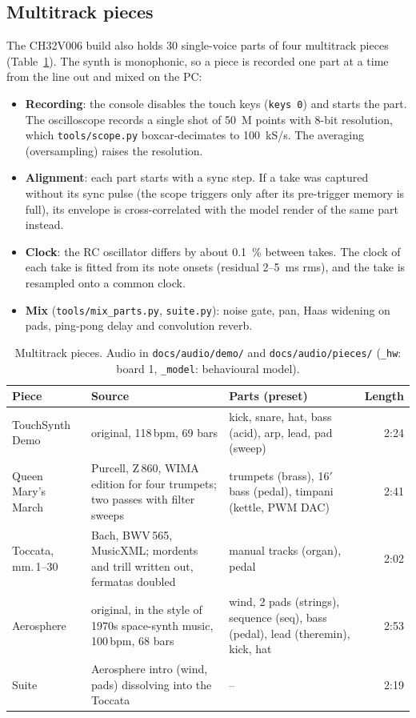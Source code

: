 \documentclass[11pt,a4paper]{article}
\newcommand{\file}[1]{\texttt{#1}}
\begin{document}
\subsection{Multitrack pieces}
The CH32V006 build also holds 30 single-voice parts of four multitrack pieces (Table~\ref{tab:pieces}).
The synth is monophonic, so a piece is recorded one part at a time from the line out and mixed on the PC:
\begin{itemize}
  \item \textbf{Recording}: the console disables the touch keys (\texttt{keys 0}) and starts the part. The
    oscilloscope records a single shot of \SI{50}{M} points with 8-bit resolution, which
    \file{tools/scope.py} boxcar-decimates to \SI{100}{kS/s}. The averaging (oversampling) raises the
    resolution.
  \item \textbf{Alignment}: each part starts with a sync step. If a take was captured without its sync pulse
    (the scope triggers only after its pre-trigger memory is full), its envelope is cross-correlated with
    the model render of the same part instead.
  \item \textbf{Clock}: the RC oscillator differs by about \SI{0.1}{\percent} between takes. The clock of
    each take is fitted from its note onsets (residual 2--\SI{5}{ms} rms), and the take is resampled onto
    a common clock.
  \item \textbf{Mix} (\file{tools/mix\_parts.py}, \file{suite.py}): noise gate, pan, Haas widening on pads,
    ping-pong delay and convolution reverb.
\end{itemize}

\begin{table}[h]
\centering\small
\caption{Multitrack pieces. Audio in \file{docs/audio/demo/} and \file{docs/audio/pieces/}
(\texttt{\_hw}: board 1, \texttt{\_model}: behavioural model).}\label{tab:pieces}
\begin{tabularx}{\textwidth}{@{}l >{\raggedright\arraybackslash}X >{\raggedright\arraybackslash}X r@{}}
\toprule
Piece & Source & Parts (preset) & Length \\
\midrule
TouchSynth Demo & original, 118\,bpm, 69 bars & kick, snare, hat, bass (acid), arp, lead, pad (sweep) & 2:24 \\
Queen Mary's March & Purcell, Z\,860, WIMA edition for four trumpets; two passes with filter sweeps
  & 4 trumpets (brass), 16$'$ bass (pedal), timpani (kettle, PWM DAC) & 2:41 \\
Toccata, mm.\,1--30 & Bach, BWV\,565, MusicXML; mordents and trill written out, fermatas doubled
  & 8 manual tracks (organ), pedal & 2:02 \\
Aerosphere & original, in the style of 1970s space-synth music, 100\,bpm, 68 bars
  & wind, 2 pads (strings), sequence (seq), bass (pedal), lead (theremin), kick, hat & 2:53 \\
Suite & Aerosphere intro (wind, pads) dissolving into the Toccata & -- & 2:19 \\
\bottomrule
\end{tabularx}
\end{table}
\end{document}
